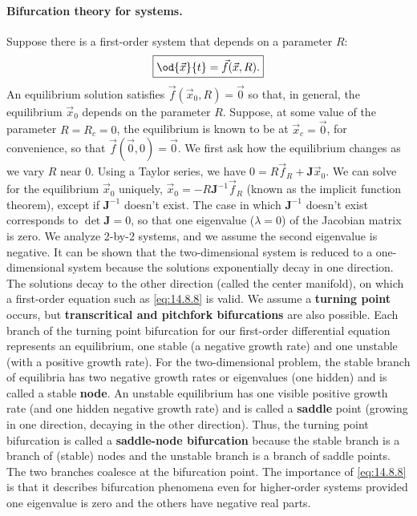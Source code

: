 \paragraph{Bifurcation theory for systems.}
Suppose there is a first-order system that depends on a parameter $R$:
\begin{equation}
\boxed{\od{\vec{x}}{t} = \vec{f}(\vec{x}, R).}
\label{eq:14.8.19}
\end{equation}
An equilibrium solution satisfies $\vec{f}(\vec{x}_0, R) = \vec{0}$ so that, in general, the equilibrium $\vec{x}_0$ depends on the parameter $R$. Suppose, at some value of the parameter $R = R_c = 0$, the equilibrium is known to be at $\vec{x}_c = \vec{0}$, for convenience, so that $\vec{f}(\vec{0},0) = \vec{0}$. We first ask how the equilibrium changes as we vary $R$ near 0. Using a Taylor series, we have $0 = R\vec{f}_R + \boldsymbol{J}\vec{x}_0$. We can solve for the equilibrium $\vec{x}_0$ uniquely, $\vec{x}_0 = -R\boldsymbol{J}^{-1}\vec{f}_R$ (known as the implicit function theorem), except if $\boldsymbol{J}^{-1}$ doesn't exist. The case in which $\boldsymbol{J}^{-1}$ doesn't exist corresponds to $\det\boldsymbol{J} = 0$, so that one eigenvalue ($\lambda = 0$) of the Jacobian matrix is zero. We analyze 2-by-2 systems, and we assume the second eigenvalue is negative. It can be shown that the two-dimensional system is reduced to a one-dimensional system because the solutions exponentially decay in one direction. The solutions decay to the other direction (called the center manifold), on which a first-order equation such as \eqref{eq:14.8.8} is valid. We assume a \textbf{turning point} occurs, but \textbf{transcritical and pitchfork bifurcations} are also possible. Each branch of the turning point bifurcation for our first-order differential equation represents an equilibrium, one stable (a negative growth rate) and one unstable (with a positive growth rate). For the two-dimensional problem, the stable branch of equilibria has two negative growth rates or eigenvalues (one hidden) and is called a stable \textbf{node}. An unstable equilibrium has one visible positive growth rate (and one hidden negative growth rate) and is called a \textbf{saddle} point (growing in one direction, decaying in the other direction). Thus, the turning point bifurcation is called a \textbf{saddle-node bifurcation} because the stable branch is a branch of (stable) nodes and the unstable branch is a branch of saddle points. The two branches coalesce at the bifurcation point. The importance of \eqref{eq:14.8.8} is that it describes bifurcation phenomena even for higher-order systems provided one eigenvalue is zero and the others have negative real parts.

